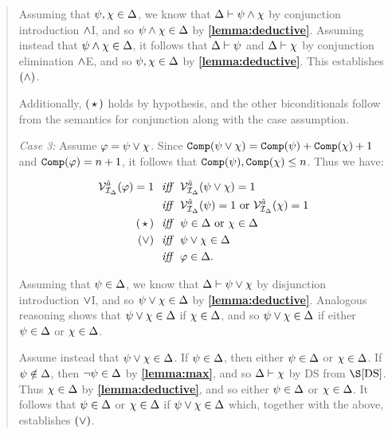 \begin{quote}
  Assuming that $\psi,\chi\in\Delta$, we know that $\Delta\vdash\psi\wedge\chi$ by conjunction introduction $\wedge$I, and so $\psi\wedge\chi\in\Delta$ by \textbf{\ref{lemma:deductive}}.
  Assuming instead that $\psi\wedge\chi\in\Delta$, it follows that $\Delta\vdash\psi$ and $\Delta\vdash\chi$ by conjunction elimination $\wedge$E, and so $\psi,\chi\in\Delta$ by \textbf{\ref{lemma:deductive}}.
  This establishes $(\wedge)$.

  Additionally, $(\hspace{1.6pt}\star\hspace{1.6pt})$ holds by hypothesis, and the other biconditionals follow from the semantics for conjunction along with the case assumption.


  \textit{Case 3:}
  Assume $\varphi=\psi\vee\chi$.
  Since $\texttt{Comp}(\psi\vee\chi)=\texttt{Comp}(\psi)+\texttt{Comp}(\chi)+1$ and  $\texttt{Comp}(\varphi)=n+1$, it follows that $\texttt{Comp}(\psi),\texttt{Comp}(\chi)\leq n$.
  Thus we have:

  \vspace{-.2in}
  \begin{align*}
    \mathcal{V}_{\mathcal{I}_\Delta}^{\hat{a}}(\varphi)=1 &\textit{ ~iff~ } \mathcal{V}_{\mathcal{I}_\Delta}^{\hat{a}}(\psi\vee\chi)=1\\
      &\textit{ ~iff~ } \mathcal{V}_{\mathcal{I}_\Delta}^{\hat{a}}(\psi)=1 \text{ or } \mathcal{V}_{\mathcal{I}_\Delta}^{\hat{a}}(\chi)=1 \\
      (\hspace{1.6pt}\star\hspace{1.6pt}) &\textit{ ~iff~ } \psi\in\Delta \text{ or } \chi\in\Delta \\
      (\vee) &\textit{ ~iff~ } \psi\vee\chi\in\Delta \\
      &\textit{ ~iff~ } \varphi\in\Delta.
  \end{align*}

  Assuming that $\psi\in\Delta$, we know that $\Delta\vdash\psi\vee\chi$ by disjunction introduction $\vee$I, and so $\psi\vee\chi\in\Delta$ by \textbf{\ref{lemma:deductive}}.
  Analogous reasoning shows that $\psi\vee\chi\in\Delta$ if $\chi\in\Delta$, and so $\psi\vee\chi\in\Delta$ if either $\psi\in\Delta$ or $\chi\in\Delta$. 

  Assume instead that $\psi\vee\chi\in\Delta$.
  If $\psi\in\Delta$, then either $\psi\in\Delta$ or $\chi\in\Delta$.
  If $\psi\notin\Delta$, then $\neg\psi\in\Delta$ by \textbf{\ref{lemma:max}}, and so $\Delta\vdash\chi$ by DS from $\S\ref{DS}$.
  Thus $\chi\in\Delta$ by \textbf{\ref{lemma:deductive}}, and so either $\psi\in\Delta$ or $\chi\in\Delta$. 
  It follows that $\psi\in\Delta$ or $\chi\in\Delta$ if $\psi\vee\chi\in\Delta$ which, together with the above, establishes $(\vee)$.  


\end{quote}
